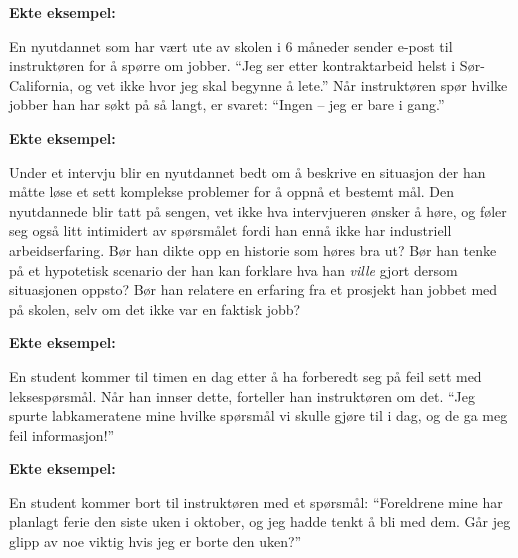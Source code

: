 \vfil \eject
\noindent
{\bf Ekte eksempel:} 

En nyutdannet som har vært ute av skolen i 6 måneder sender e-post til instruktøren for å spørre om jobber.  ``Jeg ser etter kontraktarbeid helst i Sør-California, og vet ikke hvor jeg skal begynne å lete.''  Når instruktøren spør hvilke jobber han har søkt på så langt, er svaret: ``Ingen -- jeg er bare i gang.''






\vfil \eject
\noindent
{\bf Ekte eksempel:} 

Under et intervju blir en nyutdannet bedt om å beskrive en situasjon der han måtte løse et sett komplekse problemer for å oppnå et bestemt mål.  Den nyutdannede blir tatt på sengen, vet ikke hva intervjueren ønsker å høre, og føler seg også litt intimidert av spørsmålet fordi han ennå ikke har industriell arbeidserfaring.  Bør han dikte opp en historie som høres bra ut?  Bør han tenke på et hypotetisk scenario der han kan forklare hva han {\it ville} gjort dersom situasjonen oppsto?  Bør han relatere en erfaring fra et prosjekt han jobbet med på skolen, selv om det ikke var en faktisk jobb?






\vfil \eject
\noindent
{\bf Ekte eksempel:} 

En student kommer til timen en dag etter å ha forberedt seg på feil sett med leksespørsmål.  Når han innser dette, forteller han instruktøren om det.  ``Jeg spurte labkameratene mine hvilke spørsmål vi skulle gjøre til i dag, og de ga meg feil informasjon!''







\vfil \eject
\noindent
{\bf Ekte eksempel:} 

En student kommer bort til instruktøren med et spørsmål: ``Foreldrene mine har planlagt ferie den siste uken i oktober, og jeg hadde tenkt å bli med dem.  Går jeg glipp av noe viktig hvis jeg er borte den uken?''







